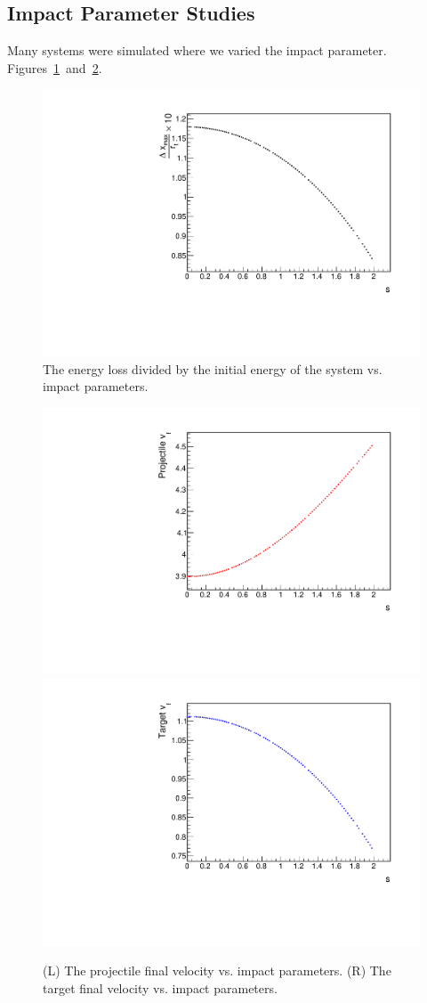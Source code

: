 \documentclass[aps,prl,floatfix,preprint,nofootinbib]{revtex4}
\begin{document}
\subsection{Impact Parameter Studies}
Many systems were simulated where we varied the impact parameter. Figures~\ref{fig:changing_s1}~and~\ref{fig:changing_s2}.
\begin{figure}[h!]
  \includegraphics[width=.45\linewidth]{plots/trend_plots/Eloss_vs_s.pdf}
  \caption{The energy loss divided by the initial energy of the system vs. impact parameters.}
  \label{fig:changing_s1}  
\end{figure}
\begin{figure}[h!]
  \includegraphics[width=.45\linewidth]{plots/trend_plots/pvf_vs_s.pdf}
  \includegraphics[width=.45\linewidth]{plots/trend_plots/tvf_vs_s.pdf}
  \caption{(L) The projectile final velocity vs. impact parameters. (R) The target final velocity vs. impact parameters.}
  \label{fig:changing_s2}
\end{figure}
\end{document}
